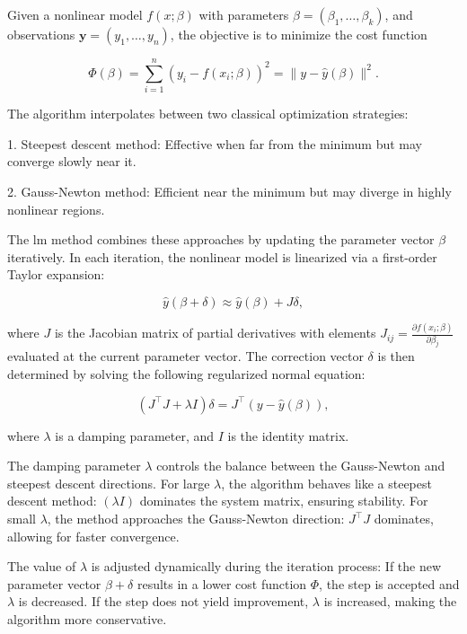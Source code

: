 Given a nonlinear model $f(x; \beta)$ with parameters $\beta = (\beta_1, \dots, \beta_k)$, and observations $\mathbf{y} = (y_1, \dots, y_n)$, the objective is to minimize the cost function

\begin{equation}
	\Phi(\beta) = \sum_{i=1}^{n} \left( y_i - f(x_i; \beta) \right)^2 = \| y - \hat{y}(\beta) \|^2.
\end{equation}

The algorithm interpolates between two classical optimization strategies:

1. Steepest descent method: Effective when far from the minimum but may converge slowly near it.

2. Gauss-Newton method: Efficient near the minimum but may diverge in highly nonlinear regions.

The \ac{lm} method combines these approaches by updating the parameter vector $\beta$ iteratively. In each iteration, the nonlinear model is linearized via a first-order Taylor expansion:

\begin{equation}
	\hat{y}(\beta + \delta) \approx \hat{y}(\beta) + J \delta,
\end{equation}

where $J$ is the Jacobian matrix of partial derivatives with elements $J_{ij} = \frac{\partial f(x_i; \beta)}{\partial \beta_j}$ evaluated at the current parameter vector. The correction vector $\delta$ is then determined by solving the following regularized normal equation:

\begin{equation}
	(J^\top J + \lambda I)\delta = J^\top (y - \hat{y}(\beta)),
\end{equation}

where $\lambda$ is a damping parameter, and $I$ is the identity matrix.

The damping parameter $\lambda$ controls the balance between the Gauss-Newton and steepest descent directions. For large $\lambda$, the algorithm behaves like a steepest descent method: $(\lambda I)$ dominates the system matrix, ensuring stability. For small $\lambda$, the method approaches the Gauss-Newton direction: $J^\top J$ dominates, allowing for faster convergence.

The value of $\lambda$ is adjusted dynamically during the iteration process:
If the new parameter vector $\beta + \delta$ results in a lower cost function $\Phi$, the step is accepted and $\lambda$ is decreased. If the step does not yield improvement, $\lambda$ is increased, making the algorithm more conservative.

